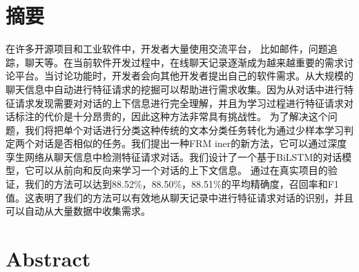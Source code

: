 \maketitle%
\MAKETITLE%
\makedeclaration%
\intobmk\chapter*{摘\quad 要}%
\setcounter{page}{1}%

在许多开源项目和工业软件中，开发者大量使用交流平台， 比如邮件，问题追踪，聊天等。在当前软件开发过程中，在线聊天记录逐渐成为越来越重要的需求讨论平台。当讨论功能时，开发者会向其他开发者提出自己的软件需求。从大规模的
聊天信息中自动进行特征请求的挖掘可以帮助进行需求收集。因为从对话中进行特征请求发现需要对对话的上下信息进行完全理解，并且为学习过程进行特征请求对话标注的代价是十分昂贵的，因此这种方法非常具有挑战性。
为了解决这个问题，我们将把单个对话进行分类这种传统的文本分类任务转化为通过少样本学习判定两个对话是否相似的任务。我们提出一种FRM iner的新方法，它可以通过深度孪生网络从聊天信息中检测特征请求对话。我们设计了一个基于BiLSTM的对话模型，它可以从前向和反向来学习一个对话的上下文信息。
通过在真实项目的验证，我们的方法可以达到88.52\%，88.50\%，88.51\%的平均精确度，召回率和F1值。这表明了我们的方法可以有效地从聊天记录中进行特征请求对话的识别，并且可以自动从大量数据中收集需求。

\intobmk\chapter*{Abstract}%

